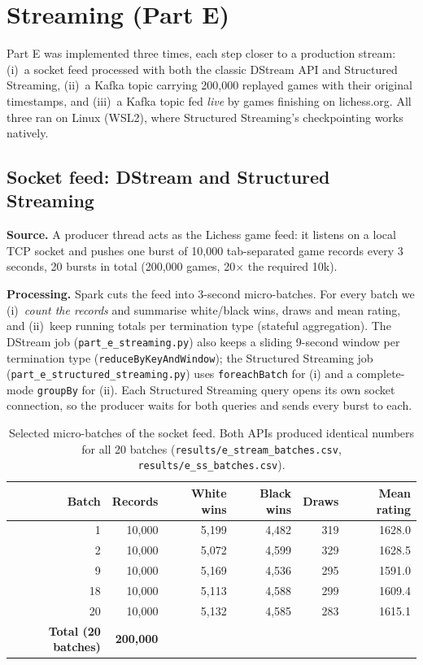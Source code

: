 \documentclass[11pt,a4paper]{article}
\begin{document}
\section{Streaming (Part E)}\label{sec:stream}
Part E was implemented three times, each step closer to a production stream:
(i)~a socket feed processed with both the classic DStream API and Structured Streaming,
(ii)~a Kafka topic carrying 200,000 replayed games with their original timestamps, and
(iii)~a Kafka topic fed \emph{live} by games finishing on lichess.org.
All three ran on Linux (WSL2), where Structured Streaming's checkpointing works natively.

\subsection{Socket feed: DStream and Structured Streaming}
\textbf{Source.} A producer thread acts as the Lichess game feed: it listens on a local TCP
socket and pushes one burst of 10,000 tab-separated game records every 3 seconds,
20 bursts in total (200,000 games, 20$\times$ the required 10k).

\textbf{Processing.} Spark cuts the feed into 3-second micro-batches. For every batch we
(i)~\emph{count the records} and summarise white/black wins, draws and mean rating, and
(ii)~keep running totals per termination type (stateful aggregation). The DStream job
(\texttt{part\_e\_streaming.py}) also keeps a sliding 9-second window per termination type
(\texttt{reduceByKeyAndWindow}); the Structured Streaming job
(\texttt{part\_e\_structured\_streaming.py}) uses \texttt{foreachBatch} for (i) and a
complete-mode \texttt{groupBy} for (ii). Each Structured Streaming query opens its own socket
connection, so the producer waits for both queries and sends every burst to each.

\begin{table}[H]\centering\small
\caption{Selected micro-batches of the socket feed. Both APIs produced identical numbers for
all 20 batches (\texttt{results/e\_stream\_batches.csv}, \texttt{results/e\_ss\_batches.csv}).}
\begin{tabular}{@{}rrrrrr@{}}\toprule
Batch & Records & White wins & Black wins & Draws & Mean rating\\\midrule
1 & 10,000 & 5,199 & 4,482 & 319 & 1628.0\\
2 & 10,000 & 5,072 & 4,599 & 329 & 1628.5\\
9 & 10,000 & 5,169 & 4,536 & 295 & 1591.0\\
18 & 10,000 & 5,113 & 4,588 & 299 & 1609.4\\
20 & 10,000 & 5,132 & 4,585 & 283 & 1615.1\\\midrule
\textbf{Total (20 batches)} & \textbf{200,000} & & & &\\\bottomrule
\end{tabular}\end{table}
\end{document}
